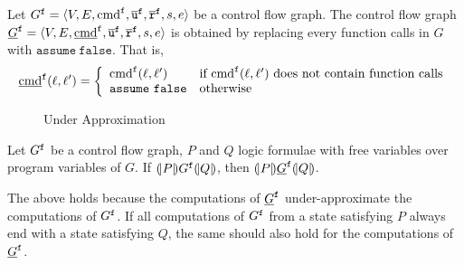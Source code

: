 
Let $G^{\mathtt{{f}}} = \langle V, E, \textmd{cmd}^{\mathtt{{f}}}, \overline{\texttt{u}}^{\mathtt{{f}}}, \overline{\texttt{r}}^{\mathtt{{f}}},s,e \rangle$ be a control flow
graph. The control flow graph $\underline{G}^{\mathtt{{f}}} = \langle V, E,
\underline{\textmd{cmd}}^{\mathtt{{f}}}, \overline{\texttt{u}}^{\mathtt{{f}}}, \overline{\texttt{r}}^{\mathtt{{f}}},s,e \rangle$ is obtained by replacing every
function calls in $G$ with $\mathtt{assume\ false}$. That is,
\begin{equation*}
  \underline{\textmd{cmd}}^{\mathtt{{f}}} (\ell, \ell') =
  \left\{
    \begin{array}{ll}
      \textmd{cmd}^{\mathtt{{f}}} (\ell, \ell') & 
      \textmd{if } \textmd{cmd}^{\mathtt{{f}}} (\ell, \ell') 
      \textmd{ does not contain function calls}\\
      \mathtt{assume\ false} &
      \textmd{otherwise}
    \end{array}
  \right.
\end{equation*}

\begin{figure}
  \centering

  \caption{Under Approximation}
  \label{figure:under-approximation}
\end{figure}

\begin{proposition}
  Let $G^{\mathtt{{f}}}$ be a control flow graph, $P$ and $Q$ logic formulae with
  free variables over program variables of $G$. If $(\!| {P} |\!)
  G^{\mathtt{{f}}} (\!| {Q} |\!)$, then 
  $(\!| {P} |\!) \underline{G}^{\mathtt{{f}}} (\!| {Q} |\!)$.
\end{proposition}
The above holds because the computations of $\underline{G}^{\mathtt{{f}}}$ under-approximate the computations of $G^{\mathtt{{f}}}$. If all computations of $G^{\mathtt{{f}}}$ from a state satisfying $P$ always end with a state satisfying $Q$, the same should also hold for the computations of $\underline{G}^{\mathtt{{f}}}$.
